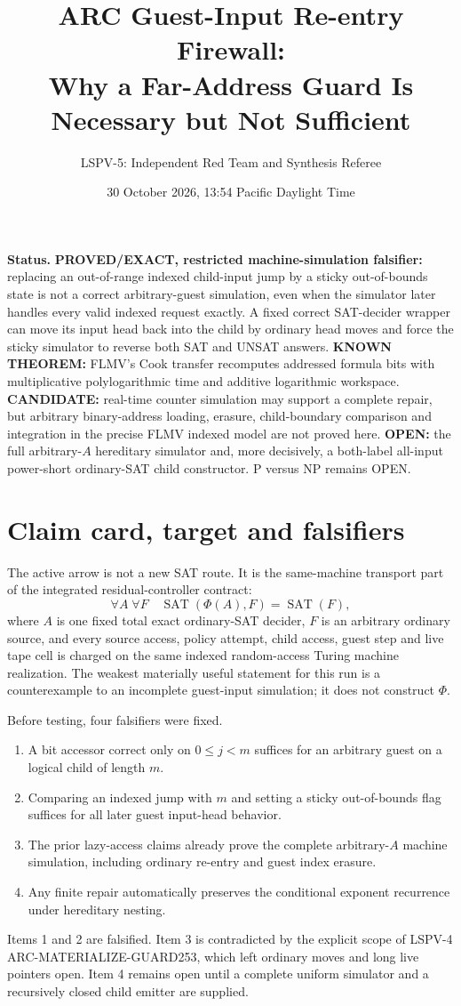 \documentclass[11pt]{article}
\title{ARC Guest-Input Re-entry Firewall:\\Why a Far-Address Guard Is Necessary but Not Sufficient}
\author{LSPV-5: Independent Red Team and Synthesis Referee}
\date{30 October 2026, 13:54 Pacific Daylight Time}
\begin{document}
\maketitle

\noindent\textbf{Status.}
\textbf{PROVED/EXACT, restricted machine-simulation falsifier:} replacing an
out-of-range indexed child-input jump by a sticky out-of-bounds state is not a
correct arbitrary-guest simulation, even when the simulator later handles every
valid indexed request exactly.  A fixed correct SAT-decider wrapper can move its
input head back into the child by ordinary head moves and force the sticky
simulator to reverse both SAT and UNSAT answers.  \textbf{KNOWN THEOREM:}
FLMV's Cook transfer recomputes addressed formula bits with multiplicative
polylogarithmic time and additive logarithmic workspace.  \textbf{CANDIDATE:}
real-time counter simulation may support a complete repair, but arbitrary
binary-address loading, erasure, child-boundary comparison and integration in
the precise FLMV indexed model are not proved here.  \textbf{OPEN:} the full
arbitrary-$A$ hereditary simulator and, more decisively, a both-label all-input
power-short ordinary-SAT child constructor.  P versus NP remains OPEN.

\section{Claim card, target and falsifiers}
The active arrow is not a new SAT route.  It is the same-machine transport part
of the integrated residual-controller contract:
\[
 \forall A\;\forall F\quad
 \operatorname{SAT}(\Phi(A),F)=\operatorname{SAT}(F),
\]
where $A$ is one fixed total exact ordinary-SAT decider, $F$ is an arbitrary
ordinary source, and every source access, policy attempt, child access, guest
step and live tape cell is charged on the same indexed random-access Turing
machine realization.  The weakest materially useful statement for this run is
a counterexample to an incomplete guest-input simulation; it does not construct
$\Phi$.

Before testing, four falsifiers were fixed.
\begin{enumerate}
\item A bit accessor correct only on $0\le j<m$ suffices for an arbitrary
guest on a logical child of length $m$.
\item Comparing an indexed jump with $m$ and setting a sticky out-of-bounds
flag suffices for all later guest input-head behavior.
\item The prior lazy-access claims already prove the complete arbitrary-$A$
machine simulation, including ordinary re-entry and guest index erasure.
\item Any finite repair automatically preserves the conditional exponent
recurrence under hereditary nesting.
\end{enumerate}
Items 1 and 2 are falsified.  Item 3 is contradicted by the explicit scope of
LSPV-4 ARC-MATERIALIZE-GUARD253, which left ordinary moves and long live
pointers open.  Item 4 remains open until a complete uniform simulator and a
recursively closed child emitter are supplied.
\end{document}
